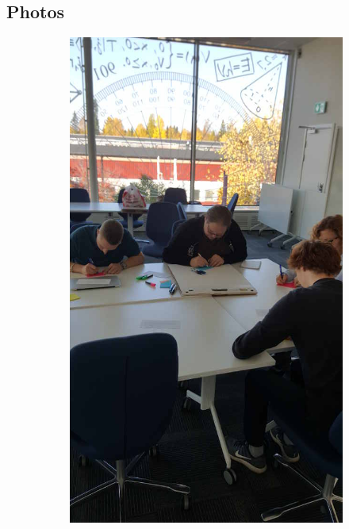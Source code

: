 \subsection*{Photos}
\begin{figure}[hb]
\centering
    \begin{subfigure}{.32\textwidth}
        \centering
        \includegraphics[width=\textwidth, angle=270, origin=c]{img/workshop1_resized.jpg}
        \label{fig:workshop1}
    \end{subfigure}

\end{figure}
